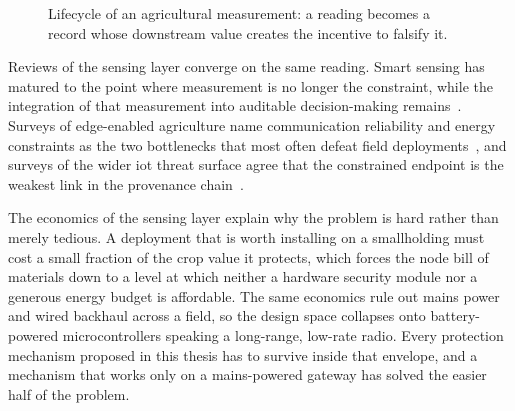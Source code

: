 \documentclass[12pt,a4paper,oneside]{book}
\begin{document}
\begin{figure}[htbp]
  \centering
  \caption{Lifecycle of an agricultural measurement: a reading becomes a
           record whose downstream value creates the incentive to falsify it.}
  \label{fig:lifecycle}
\end{figure}

Reviews of the sensing layer converge on the same reading. Smart sensing has
matured to the point where measurement is no longer the constraint, while the
integration of that measurement into auditable decision-making
remains~\cite{soussi2024smartsensors, gong2025edge}. Surveys of edge-enabled
agriculture name communication reliability and energy constraints as the two
bottlenecks that most often defeat field deployments~\cite{gong2025edge}, and
surveys of the wider \gls{iot} threat surface agree that the constrained
endpoint is the weakest link in the provenance chain~\cite{aouedi2024surveyintelligent,
sahu2024exploringsecurity}.

The economics of the sensing layer explain why the problem is hard rather than
merely tedious. A deployment that is worth installing on a smallholding must
cost a small fraction of the crop value it protects, which forces the node bill
of materials down to a level at which neither a hardware security module nor a
generous energy budget is affordable. The same economics rule out mains power
and wired backhaul across a field, so the design space collapses onto
battery-powered microcontrollers speaking a long-range, low-rate radio. Every
protection mechanism proposed in this thesis has to survive inside that
envelope, and a mechanism that works only on a mains-powered gateway has solved
the easier half of the problem.
\end{document}
